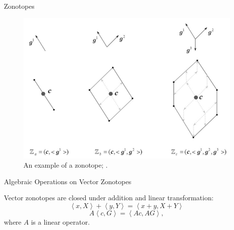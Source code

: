 \documentclass{beamer}
\newcommand{\Zo}[2] {\left\langle {#1},{#2}
	\right\rangle}
\begin{document}
\begin{frame}{Zonotopes}
	\begin{flushleft}
		
		\begin{figure}
			\centering
			\includegraphics[width=0.7\linewidth]{zonotopes}
			\caption{An example of a zonotope;  .}
			\label{fig:zonotopes}
		\end{figure}
		
		
	\end{flushleft}
\end{frame}




\begin{frame}{Algebraic Operations on Vector Zonotopes}
	\begin{flushleft}
		
		Vector zonotopes are closed under addition and linear transformation:
		\begin{equation} 
			\label{eq_zonotope_addition}
			\Zo{x}{X}+\Zo{y}{Y} = \Zo{x+y}{X+Y}
		\end{equation}
		\begin{equation} 
			\label{eq_zonotope_linear_tranform}
			A\Zo{c}{G} = \Zo{Ac}{AG},
		\end{equation}
		where $A$ is a linear operator.
	\end{flushleft}
\end{frame}
\end{document}
